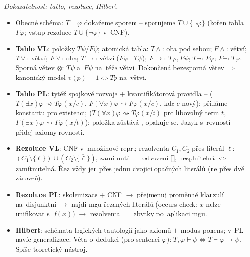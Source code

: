 \documentclass[11pt,a4paper]{article}
\newcommand{\eclause}{\mathord{\text{\framebox[1.25ex][c]{\rule{0pt}{0.95ex}}}}}
\newcommand{\closed}{\ensuremath{\otimes}}            %
\begin{document}
\begin{poznamka}
\smallskip
\emph{Dokazatelnost: tablo, rezoluce, Hilbert.}
\begin{itemize}
  \item Obecné schéma: $T\vdash\varphi$ dokažeme sporem -- sporujeme $T\cup\{\neg\varphi\}$ (kořen tabla $F\varphi$; vstup rezoluce $T\cup\{\neg\varphi\}$ v~CNF).
  \item \textbf{Tablo VL}: položky $T\psi$/$F\psi$; atomická tabla: $T\wedge$: oba pod sebou; $F\wedge$: větví; $T\vee$: větví; $F\vee$: oba; $T{\to}$: větví ($F\varphi\mid T\psi$); $F{\to}$: $T\varphi,F\psi$; $T\neg$: $F\varphi$; $F\neg$: $T\varphi$. Sporná větev \closed{}: $T\psi$ a~$F\psi$ na~téže větvi. Dokončená bezesporná větev $\Rightarrow$ kanonický model $v(p)=1 \iff Tp$ na~větvi.
  \item \textbf{Tablo PL}: tytéž spojkové rozvoje $+$ kvantifikátorová pravidla --  ($T(\exists x)\varphi\rightsquigarrow T\varphi(x/c)$, $F(\forall x)\varphi\rightsquigarrow F\varphi(x/c)$, kde $c$ nový): přidáme konstantu pro existenci;  ($T(\forall x)\varphi\rightsquigarrow T\varphi(x/t)$ pro libovolný term $t$, $F(\exists x)\varphi\rightsquigarrow F\varphi(x/t)$): položka zůstává , opakuje se. Jazyk s~rovností: přidej axiomy rovnosti.
  \item \textbf{Rezoluce VL}: CNF v~množinové repr.; rezolventa $C_1,C_2$ přes literál $\ell$: $(C_1\setminus\{\ell\})\cup(C_2\setminus\{\overline{\ell}\})$; zamítnutí $=$ odvození $\eclause$; nesplnitelná $\iff$ zamítnutelná. Řez vždy jen přes jednu dvojici opačných literálů (ne přes dvě zároveň).
  \item \textbf{Rezoluce PL}: skolemizace $+$ CNF $\to$ přejmenuj proměnné klauzulí na~disjunktní $\to$ najdi mgu řezaných literálů (occurs-check: $x$ nelze unifikovat s~$f(x)$) $\to$ rezolventa $=$ zbytky po~aplikaci mgu.
  \item \textbf{Hilbert}: schémata logických tautologií jako axiomů $+$ modus ponens; v~PL navíc generalizace. Věta o~dedukci (pro sentenci $\varphi$): $T,\varphi\vdash\psi\iff T\vdash\varphi\to\psi$. Spíše teoretický nástroj.
\end{itemize}


\end{poznamka}
\end{document}

